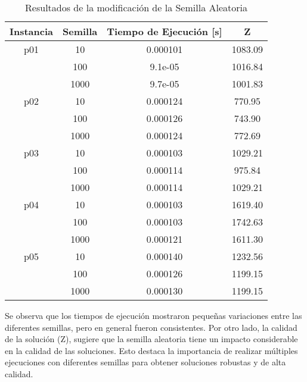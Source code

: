 \documentclass[letter, 10pt]{article}
\begin{document}
\begin{table}[H]
\centering
\begin{tabular}{|c|c|c|c|}
\hline
\textbf{Instancia} & \textbf{Semilla} & \textbf{Tiempo de Ejecución [s]} & \textbf{Z} \\ \hline
p01                & 10               & 0.000101                         & 1083.09   \\ \cline{2-4} 
                   & 100              & 9.1e-05                          & 1016.84   \\ \cline{2-4} 
                   & 1000             & 9.7e-05                          & 1001.83   \\ \hline
p02                & 10               & 0.000124                         & 770.95    \\ \cline{2-4} 
                   & 100              & 0.000126                         & 743.90    \\ \cline{2-4} 
                   & 1000             & 0.000124                         & 772.69    \\ \hline
p03                & 10               & 0.000103                         & 1029.21   \\ \cline{2-4} 
                   & 100              & 0.000114                         & 975.84    \\ \cline{2-4} 
                   & 1000             & 0.000114                         & 1029.21   \\ \hline
p04                & 10               & 0.000103                         & 1619.40   \\ \cline{2-4} 
                   & 100              & 0.000103                         & 1742.63   \\ \cline{2-4} 
                   & 1000             & 0.000121                         & 1611.30   \\ \hline
p05                & 10               & 0.000140                         & 1232.56   \\ \cline{2-4} 
                   & 100              & 0.000126                         & 1199.15   \\ \cline{2-4} 
                   & 1000             & 0.000130                         & 1199.15   \\ \hline
\end{tabular}
\caption{Resultados de la modificación de la Semilla Aleatoria}
\end{table}

Se observa que los tiempos de ejecución mostraron pequeñas variaciones entre las diferentes semillas, pero en general fueron consistentes. Por otro lado, la calidad de la solución (Z), sugiere que la semilla aleatoria tiene un impacto considerable en la calidad de las soluciones. Esto destaca la importancia de realizar múltiples ejecuciones con diferentes semillas para obtener soluciones robustas y de alta calidad.
\end{document}
